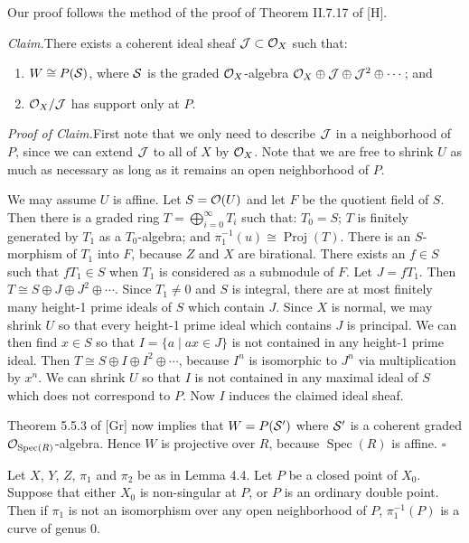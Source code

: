 \documentclass[12pt]{memoir}
\providecommand{\Spec}{\operatorname{Spec}}
\providecommand{\Proj}{\operatorname{Proj}}
\begin{document}
\begin{ptcbp}
Our proof follows the method of the proof of Theorem II.7.17 of [H].

\emph{Claim.}\quad There exists a coherent ideal sheaf $\mathcal{J} \subset \mathcal{O}_X$ such that:

\begin{enumerate}[\upshape(i)]
\item $W \cong P(\mathcal{S})$, where $\mathcal{S}$ is the graded $\mathcal{O}_X$-algebra $\mathcal{O}_X \oplus \mathcal{J} \oplus \mathcal{J}^2 \oplus \cdots$; and
\item $\mathcal{O}_X/\mathcal{J}$ has support only at $P$.
\end{enumerate}

\emph{Proof of Claim.}\quad First note that we only need to describe $\mathcal{J}$ in a neighborhood of $P$, since we can extend $\mathcal{J}$ to all of $X$ by $\mathcal{O}_X$. Note that we are free to shrink $U$ as much as necessary as long as it remains an open neighborhood of $P$.

We may assume $U$ is affine. Let $S = \mathcal{O}(U)$ and let $F$ be the quotient field of $S$. Then there is a graded ring $T = \bigoplus_{i=0}^{\infty} T_i$ such that: $T_0 = S$; $T$ is finitely generated by $T_1$ as a $T_0$-algebra; and $\pi_1^{-1}(u) \cong \Proj(T)$. There is an $S$-morphism of $T_1$ into $F$, because $Z$ and $X$ are birational. There exists an $f \in S$ such that $fT_1 \in S$ when $T_1$ is considered as a submodule of $F$. Let $J = fT_1$. Then $T \cong S \oplus J \oplus J^2 \oplus \cdots$. Since $T_1 \neq 0$ and $S$ is integral, there are at most finitely many height-1 prime ideals of $S$ which contain $J$. Since $X$ is normal, we may shrink $U$ so that every height-1 prime ideal which contains $J$ is principal. We can then find $x \in S$ so that $I = \{a \mid ax \in J\}$ is not contained in any height-1 prime ideal. Then $T \cong S \oplus I \oplus I^2 \oplus \cdots$, because $I^n$ is isomorphic to $J^n$ via multiplication by $x^n$. We can shrink $U$ so that $I$ is not contained in any maximal ideal of $S$ which does not correspond to $P$. Now $I$ induces the claimed ideal sheaf.

Theorem 5.5.3 of [Gr] now implies that $W = P(\mathcal{S}')$ where $\mathcal{S}'$ is a coherent graded $\cO_{\Spec(R)}$-algebra. Hence $W$ is projective over $R$, because $\Spec(R)$ is affine. \hfill$\square$
\end{ptcbp}

\begin{Lem}\label{lem:4.7}
Let $X$, $Y$, $Z$, $\pi_1$ and $\pi_2$ be as in Lemma 4.4. Let $P$ be a closed point of $X_0$. Suppose that either $X_0$ is non-singular at $P$, or $P$ is an ordinary double point. Then if $\pi_1$ is not an isomorphism over any open neighborhood of $P$, $\pi_1^{-1}(P)$ is a curve of genus $0$.
\end{Lem}
\end{document}
